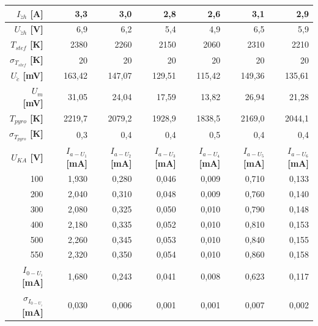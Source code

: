 \documentclass[english]{article}
\begin{document}
\begin{table}[htbp]
  \centering
\begin{tabular}{|r|r|r|r|r|r|r|}
\hline
\boldmath{}\textbf{$I_{\check{z}h}$ [A]}\unboldmath{} & 3,3   & 3,0     & 2,8   & 2,6   & 3,1   & 2,9 \bigstrut\\
\hline
\boldmath{}\textbf{$U_{\check{z}h}$ [V]}\unboldmath{} & 6,9   & 6,2   & 5,4   & 4,9   & 6,5   & 5,9 \bigstrut\\
\hline
\boldmath{}\textbf{$T_{stef}$ [K]}\unboldmath{} & 2380  & 2260  & 2150  & 2060  & 2310  & 2210 \bigstrut\\
\hline
\boldmath{}\textbf{$\sigma_{T_{stef}}$ [K]}\unboldmath{} & 20    & 20    & 20    & 20    & 20    & 20 \bigstrut\\
\hline
\boldmath{}\textbf{$U_{\check{c}}$ [mV]}\unboldmath{} & 163,42 & 147,07 & 129,51 & 115,42 & 149,36 & 135,61 \bigstrut\\
\hline
\boldmath{}\textbf{$U_{m}$ [mV]}\unboldmath{} & 31,05 & 24,04 & 17,59 & 13,82 & 26,94 & 21,28 \bigstrut\\
\hline
\boldmath{}\textbf{$T_{pyro}$ [K]}\unboldmath{} & 2219,7 & 2079,2 & 1928,9 & 1838,5 & 2169,0 & 2044,1 \bigstrut\\
\hline
\boldmath{}\textbf{$\sigma_{T_{pyro}}$ [K]}\unboldmath{} & 0,3   & 0,4   & 0,4   & 0,5   & 0,4   & 0,4 \bigstrut\\
\hline
\boldmath{}\textbf{$U_{KA}$ [V]}\unboldmath{} & \boldmath{}\textbf{$I_{a-U_1}$ [mA]}\unboldmath{} & \boldmath{}\textbf{$I_{a-U_2}$ [mA]}\unboldmath{} & \boldmath{}\textbf{$I_{a-U_3}$ [mA]}\unboldmath{} & \boldmath{}\textbf{$I_{a-U_4}$ [mA]}\unboldmath{} & \boldmath{}\textbf{$I_{a-U_5}$ [mA]}\unboldmath{} & \boldmath{}\textbf{$I_{a-U_6}$ [mA]}\unboldmath{} \bigstrut\\
\hline
100   & 1,930 & 0,280 & 0,046 & 0,009 & 0,710 & 0,133 \bigstrut\\
\hline
200   & 2,040 & 0,310 & 0,048 & 0,009 & 0,760 & 0,140 \bigstrut\\
\hline
300   & 2,080 & 0,325 & 0,050 & 0,010 & 0,790 & 0,148 \bigstrut\\
\hline
400   & 2,180 & 0,335 & 0,052 & 0,010 & 0,810 & 0,153 \bigstrut\\
\hline
500   & 2,260 & 0,345 & 0,053 & 0,010 & 0,840 & 0,155 \bigstrut\\
\hline
550   & 2,320 & 0,350 & 0,054 & 0,010 & 0,860 & 0,158 \bigstrut\\
\hline
\boldmath{}\textbf{$I_{0-U_i}$ [mA]}\unboldmath{} & 1,680 & 0,243 & 0,041 & 0,008 & 0,623 & 0,117 \bigstrut\\
\hline
\boldmath{}\textbf{$\sigma_{I_{0-U_i}}$ [mA]}\unboldmath{} & 0,030 & 0,006 & 0,001 & 0,001 & 0,007 & 0,002 \bigstrut\\
\hline
\end{tabular}%


\end{table}
\end{document}

